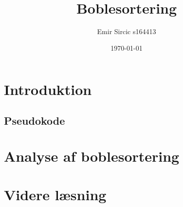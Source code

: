 \documentclass[a4paper]{article}
\title{Boblesortering}
\author{Emir Sircic s164413}
\date{\today}
\begin{document}
\maketitle

\section{Introduktion}
\subsection{Pseudokode}
\section{Analyse af boblesortering}
\section{Videre læsning}
\end{document}

